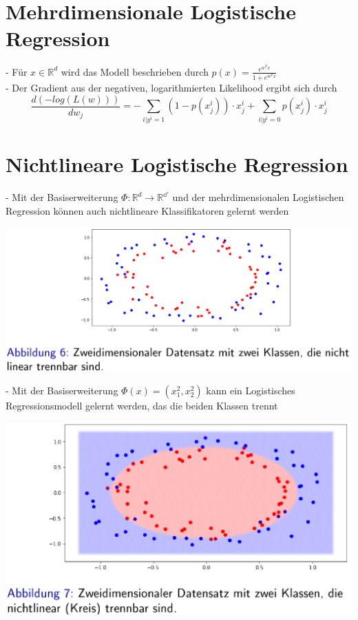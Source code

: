 \documentclass{report}
\begin{document}
\section{Mehrdimensionale Logistische Regression}
- Für $x \in \mathbb{R}^d$ wird das Modell beschrieben durch $p(x) = \frac{e^{w^Tx}}{1 + e^{w^Tx}}$\\
- Der Gradient aus der negativen, logarithmierten Likelihood ergibt sich durch
$$\frac{d(-log(L(w)))}{dw_j} = -\sum_{i|y^i = 1}(1 - p(x_j^i))\cdot x_j^i + \sum_{i|y^i = 0}p(x_j^i)\cdot x_j^i$$

\section{Nichtlineare Logistische Regression}
- Mit der Basiserweiterung $\Phi: \mathbb{R}^d \rightarrow \mathbb{R^{d'}}$ und der mehrdimensionalen
Logistischen Regression können auch nichtlineare Klassifikatoren gelernt werden
\begin{center}
  \includegraphics[scale=.3125]{ml03_5}
\end{center}
- Mit der Basiserweiterung $\Phi(x) = (x_1^2, x_2^2)$ kann ein Logistisches Regressionsmodell gelernt werden, das die beiden Klassen trennt
\begin{center}
  \includegraphics[scale=.3125]{ml03_6}
\end{center}
\end{document}

